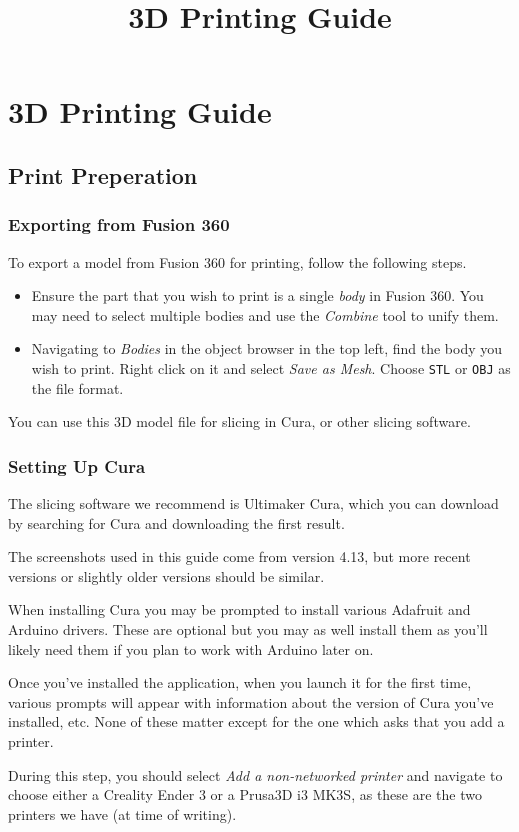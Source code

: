 \documentclass[12pt]{report}
\begin{document}
\raggedright

\title{3D Printing Guide}
\chapter*{3D Printing Guide}

\section*{Print Preperation}
\label{sec:preperation}

\subsection*{Exporting from Fusion 360}
\label{sec:exporting}

To export a model from Fusion 360 for printing, follow the following steps.

\begin{itemize}
    \item Ensure the part that you wish to print is a single \textit{body} in
        Fusion 360. You may need to select multiple bodies and use the
        \textit{Combine} tool to unify them.
    \item Navigating to \textit{Bodies} in the object browser in the top left,
        find the body you wish to print. Right click on it and select
        \textit{Save as Mesh}. Choose \texttt{STL} or \texttt{OBJ} as the file
        format. 
\end{itemize}

You can use this 3D model file for slicing in Cura, or other slicing software.

\subsection*{Setting Up Cura}
\label{sec:setup}

The slicing software we recommend is Ultimaker Cura, which you can download by
searching for Cura and downloading the first result. \par
The screenshots used in this guide come from version 4.13, but more recent
versions or slightly older versions should be similar. \par
When installing Cura you may be prompted to install various Adafruit and
Arduino drivers. These are optional but you may as well install them as you'll
likely need them if you plan to work with Arduino later on. \par
Once you've installed the application, when you launch it for the first time,
various prompts will appear with information about the version of Cura you've
installed, etc. None of these matter except for the one which asks that you
add a printer. \par
During this step, you should select \textit{Add a non-networked printer} and
navigate to choose either a Creality Ender 3 or a Prusa3D i3 MK3S, as these
are the two printers we have (at time of writing). 
\end{document}
